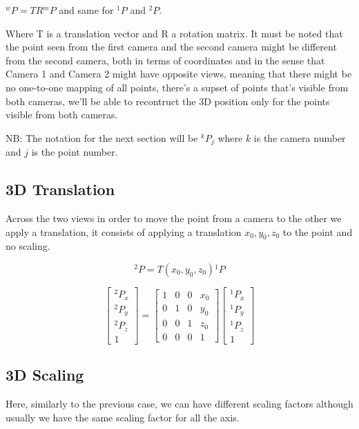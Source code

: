 \({}^wP = T R {}^mP\) and same for \({}^1P\) and \({}^2P\).

Where T is a translation vector and R a rotation matrix. It must be noted that the point seen from the first camera and the second camera might be different from the second camera, both in terms of coordinates and in the sense that Camera 1 and Camera 2 might have opposite views, meaning that there might be no one-to-one mapping of all points, there's a supset of points that's visible from both cameras, we'll be able to recontruct the 3D position only for the points visible from both cameras.


NB:
The notation for the next section will be \({}^kP_j\) where \(k\) is the camera number and \(j\) is the point number.


\subsection{3D Translation}

Across the two views in order to move the point from a camera to the other we apply a translation,
it consists of applying a translation \(x_0, y_0, z_0\) to the point and no scaling.

\[
  {}^2P = T(x_0, y_0, z_0) {}^1P 
\]

\[
    \begin{bmatrix}
        {}^2P_x \\
        {}^2P_y \\
        {}^2P_z \\
        1
    \end{bmatrix}
    =
    \begin{bmatrix}
        1 & 0 & 0 & x_0 \\
        0 & 1 & 0 & y_0 \\
        0 & 0 & 1 & z_0 \\
        0 & 0 & 0 & 1
    \end{bmatrix}
    \begin{bmatrix}
        {}^1P_x \\
        {}^1P_y \\
        {}^1P_z \\
        1
    \end{bmatrix}   
\]

\subsection{3D Scaling}

Here, similarly to the previous case, we can have different scaling factors although usually we have the same scaling factor for all the axis.

